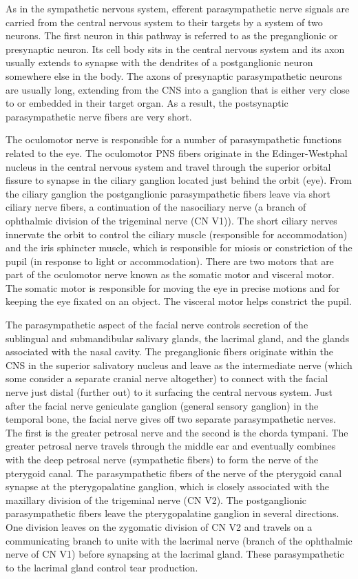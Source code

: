 As in the sympathetic nervous system, efferent parasympathetic nerve signals are carried from the central nervous system to their targets by a system of two neurons. The first neuron in this pathway is referred to as the preganglionic or presynaptic neuron. Its cell body sits in the central nervous system and its axon usually extends to synapse with the dendrites of a postganglionic neuron somewhere else in the body. The axons of presynaptic parasympathetic neurons are usually long, extending from the CNS into a ganglion that is either very close to or embedded in their target organ. As a result, the postsynaptic parasympathetic nerve fibers are very short.

The oculomotor nerve is responsible for a number of parasympathetic functions related to the eye. The oculomotor PNS fibers originate in the Edinger-Westphal nucleus in the central nervous system and travel through the superior orbital fissure to synapse in the ciliary ganglion located just behind the orbit (eye). From the ciliary ganglion the postganglionic parasympathetic fibers leave via short ciliary nerve fibers, a continuation of the nasociliary nerve (a branch of ophthalmic division of the trigeminal nerve (CN V1)). The short ciliary nerves innervate the orbit to control the ciliary muscle (responsible for accommodation) and the iris sphincter muscle, which is responsible for miosis or constriction of the pupil (in response to light or accommodation). There are two motors that are part of the oculomotor nerve known as the somatic motor and visceral motor. The somatic motor is responsible for moving the eye in precise motions and for keeping the eye fixated on an object. The visceral motor helps constrict the pupil.

The parasympathetic aspect of the facial nerve controls secretion of the sublingual and submandibular salivary glands, the lacrimal gland, and the glands associated with the nasal cavity. The preganglionic fibers originate within the CNS in the superior salivatory nucleus and leave as the intermediate nerve (which some consider a separate cranial nerve altogether) to connect with the facial nerve just distal (further out) to it surfacing the central nervous system. Just after the facial nerve geniculate ganglion (general sensory ganglion) in the temporal bone, the facial nerve gives off two separate parasympathetic nerves. The first is the greater petrosal nerve and the second is the chorda tympani. The greater petrosal nerve travels through the middle ear and eventually combines with the deep petrosal nerve (sympathetic fibers) to form the nerve of the pterygoid canal. The parasympathetic fibers of the nerve of the pterygoid canal synapse at the pterygopalatine ganglion, which is closely associated with the maxillary division of the trigeminal nerve (CN V2). The postganglionic parasympathetic fibers leave the pterygopalatine ganglion in several directions. One division leaves on the zygomatic division of CN V2 and travels on a communicating branch to unite with the lacrimal nerve (branch of the ophthalmic nerve of CN V1) before synapsing at the lacrimal gland. These parasympathetic to the lacrimal gland control tear production.

